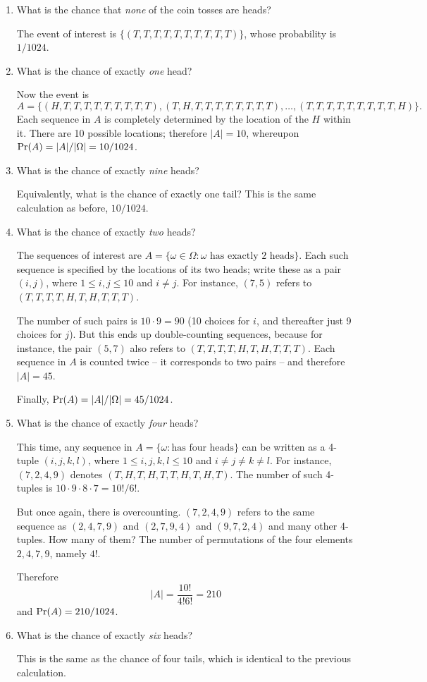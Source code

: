 \begin{enumerate} 

\item What is the chance that {\it none} of the coin tosses are heads?

The event of interest is $\{(T,T,T,T,T,T,T,T,T,T)\}$, whose probability is $1/1024$.

\item What is the chance of exactly {\it one} head?

Now the event is 
$$A = \{(H,T,T,T,T,T,T,T,T,T), (T,H,T,T,T,T,T,T,T,T), \ldots, (T,T,T,T,T,T,T,T,T,H)\} .$$
Each sequence in $A$ is completely determined by the location of the $H$ within it. There are 10 possible locations; therefore $|A| = 10$, whereupon $\mbox{\rm Pr}(A) = |A|/|\Omega| = 10/1024$.

\item What is the chance of exactly {\it nine} heads?

Equivalently, what is the chance of exactly one tail? This is the same calculation as before, $10/1024$.

\item What is the chance of exactly {\it two} heads?

The sequences of interest are $A = \{\omega \in \Omega: \mbox{$\omega$ has exactly 2 heads}\}$. Each such sequence is specified by the locations of its two heads; write these as a pair $(i,j)$, where $1 \leq i,j \leq 10$ and $i \neq j$. For instance, $(7,5)$ refers to $(T,T,T,T,H,T,H,T,T,T)$. 

The number of such pairs is $10 \cdot 9 = 90$ (10 choices for $i$, and thereafter just 9 choices for $j$). But this ends up double-counting sequences, because for instance, the pair $(5,7)$ also refers to $(T,T,T,T,H,T,H,T,T,T)$. Each sequence in $A$ is counted twice -- it corresponds to two pairs -- and therefore $|A| = 45$.

Finally, $\mbox{\rm Pr}(A) = |A|/|\Omega| = 45/1024$.

\item What is the chance of exactly {\it four} heads?

This time, any sequence in $A = \{\omega: \mbox{has four heads}\}$ can be written as a 4-tuple $(i,j,k,l)$, where $1 \leq i,j,k,l \leq 10$ and $i \neq j \neq k \neq l$. For instance,
$(7,2,4,9)$ denotes $(T,H,T,H,T,T,H,T,H,T)$. The number of such 4-tuples is $10 \cdot 9 \cdot 8 \cdot 7 = 10!/6!$.

But once again, there is overcounting. $(7,2,4,9)$ refers to the same sequence as $(2,4,7,9)$ and $(2,7,9,4)$ and $(9,7,2,4)$ and many other 4-tuples. How many of them? The number of permutations of the four elements $2,4,7,9$, namely $4!$.

Therefore
$$ |A| = \frac{10!}{4!6!} = 210$$
and $\mbox{\rm Pr}(A) = 210/1024$.

\item What is the chance of exactly {\it six} heads?

This is the same as the chance of four tails, which is identical to the previous calculation.

\end{enumerate}

